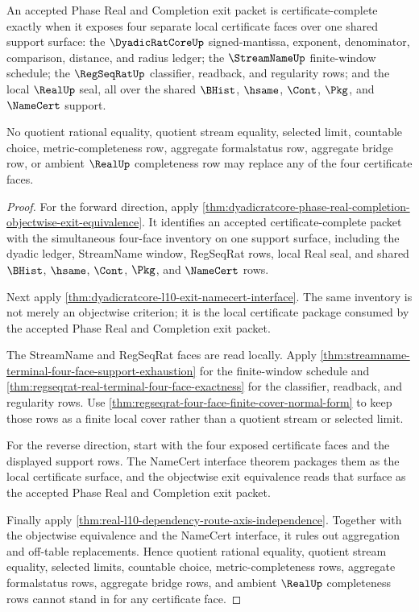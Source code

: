 \begin{theorem}
\label{thm:dyadicratcore-four-face-exit-facewise-certificate}
An accepted Phase Real and Completion exit packet is certificate-complete exactly when it exposes four separate local certificate faces over one shared support surface: the $\DyadicRatCoreUp$ signed-mantissa, exponent, denominator, comparison, distance, and radius ledger; the $\StreamNameUp$ finite-window schedule; the $\RegSeqRatUp$ classifier, readback, and regularity rows; and the local $\RealUp$ seal, all over the shared $\BHist$, $\hsame$, $\Cont$, $\Pkg$, and $\NameCert$ support.

No quotient rational equality, quotient stream equality, selected limit, countable choice, metric-completeness row, aggregate formalstatus row, aggregate bridge row, or ambient $\RealUp$ completeness row may replace any of the four certificate faces.
\end{theorem}
\begin{proof}
For the forward direction, apply \autoref{thm:dyadicratcore-phase-real-completion-objectwise-exit-equivalence}. It identifies an accepted certificate-complete packet with the simultaneous four-face inventory on one support surface, including the dyadic ledger, StreamName window, RegSeqRat rows, local Real seal, and shared $\BHist$, $\hsame$, $\Cont$, $\Pkg$, and $\NameCert$ rows.

Next apply \autoref{thm:dyadicratcore-l10-exit-namecert-interface}. The same inventory is not merely an objectwise criterion; it is the local certificate package consumed by the accepted Phase Real and Completion exit packet.

The StreamName and RegSeqRat faces are read locally. Apply \autoref{thm:streamname-terminal-four-face-support-exhaustion} for the finite-window schedule and \autoref{thm:regseqrat-real-terminal-four-face-exactness} for the classifier, readback, and regularity rows. Use \autoref{thm:regseqrat-four-face-finite-cover-normal-form} to keep those rows as a finite local cover rather than a quotient stream or selected limit.

For the reverse direction, start with the four exposed certificate faces and the displayed support rows. The NameCert interface theorem packages them as the local certificate surface, and the objectwise exit equivalence reads that surface as the accepted Phase Real and Completion exit packet.

Finally apply \autoref{thm:real-l10-dependency-route-axis-independence}. Together with the objectwise equivalence and the NameCert interface, it rules out aggregation and off-table replacements. Hence quotient rational equality, quotient stream equality, selected limits, countable choice, metric-completeness rows, aggregate formalstatus rows, aggregate bridge rows, and ambient $\RealUp$ completeness rows cannot stand in for any certificate face.
\end{proof}

